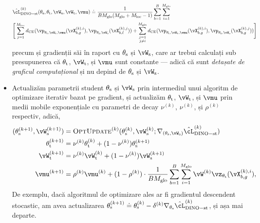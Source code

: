 \documentclass[../../book-main_ro.tex]{subfiles}
\begin{document}
\begin{itemize}
    \begin{align}\label{eq:dino_loss_teacherstudent_empirical}
        &\hat{\cL}_{\dino{}-\student\teacher}^{(k)}(\theta_{\student}, \theta_{\teacher}, \vW_{\student}, \vW_{\teacher}, \vmu) \doteq
        \frac{1}{BM_{\glo}(M_{\glo} + M_{\loc} - 1)}\sum_{b = 1}^{B}\sum_{i = 1}^{M_{\glo}}\\
        &\Bigg[\sum_{j = 1}^{M_{\loc}}d_{\CE}(\vp_{\theta_{\teacher}, \vW_{\teacher}, \vmu}(\vX_{b, g}^{(k), i}), \vp_{\theta_{\student}, \vW_{\student}}(\vX_{b, \ell}^{(k), j})) + \sum_{\substack{j = 1 \\ j \neq i}}^{M_{\glo}}d_{\CE}(\vp_{\theta_{\teacher}, \vW_{\teacher}, \vmu}(\vX_{b, g}^{(k), i}), \vp_{\theta_{\student}, \vW_{\student}}(\vX_{b, g}^{(k), j}))\Bigg]\nonumber
    \end{align}
    precum și gradienții săi în raport cu \(\theta_{\mathrm{s}}\) și \(\vW_{\student}\), care ar trebui calculați sub presupunerea că \(\theta_{\mathrm{t}}\), \(\vW_{\teacher}\), și \(\vmu\) sunt constante --- adică că sunt \textit{detașate de graficul computațional} și nu depind de \(\theta_{\mathrm{s}}\) și \(\vW_{\student}\).
    \item Actualizăm parametrii student \(\theta_{\mathrm{s}}\) și \(\vW_{\student}\) prin intermediul unui algoritm de optimizare iterativ bazat pe gradient, și actualizăm \(\theta_{\mathrm{t}}\), \(\vW_{\teacher}\), și \(\vmu\) prin medii mobile exponențiale cu parametri de decay \(\nu^{(k)}\), \(\nu^{(k)}\), și \(\rho^{(k)}\) respectiv, adică, 
    \begin{align}
        (\theta_{\student}^{(k + 1)}, \vW_{\student}^{(k + 1)})
        &= \textsc{OptUpdate}^{(k)}(\theta_{\student}^{(k)}, \vW_{\student}^{(k)}; \nabla_{(\theta_{\student}, \vW_{\student})}\hat{\cL}_{\dino-\student\teacher}^{(k)}) \\
        \theta_{\teacher}^{(k + 1)}
        &= \nu^{(k)}\theta_{\teacher}^{(k)} + (1 - \nu^{(k)})\theta_{\student}^{(k + 1)} \\
        \vW_{\teacher}^{(k + 1)}
        &= \nu^{(k)}\vW_{\teacher}^{(k)} + (1 - \nu^{(k)})\vW_{\student}^{(k + 1)} \\
        \vmu^{(k + 1)}
        &= \rho^{(k)}\vmu^{(k)} + (1 - \rho^{(k)})\cdot\frac{1}{BM_{\glo}}\sum_{b = 1}^{B}\sum_{i = 1}^{M_{\glo}}\vW^{(k)}\vz_{\theta_{\teacher}}(\vX_{b, g}^{(k), i}),
    \end{align}
    De exemplu, dacă algoritmul de optimizare ales ar fi gradientul descendent stocastic, am avea actualizarea \(\theta_{\student}^{(k + 1)} \doteq \theta_{\student}^{(k)} - \delta^{(k)}\nabla_{\theta_{\student}}\hat{\cL}_{\dino{}-\student\teacher}^{(k)}\), și așa mai departe.
\end{itemize}
\end{document}
